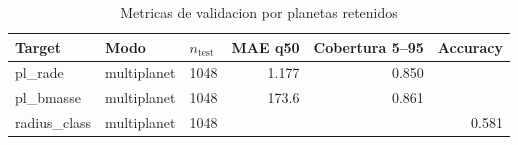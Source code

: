 \begin{table}[H]
\centering
\caption{Metricas de validacion por planetas retenidos}
\label{tab:validation-metrics}
\small
\begin{tabular}{lllrrr}
\toprule
Target & Modo & $n_{\mathrm{test}}$ & MAE q50 & Cobertura 5--95 & Accuracy \\
\midrule
pl\_rade & multiplanet & 1048 & 1.177 & 0.850 &  \\
pl\_bmasse & multiplanet & 1048 & 173.6 & 0.861 &  \\
radius\_class & multiplanet & 1048 &  &  & 0.581 \\
\bottomrule
\end{tabular}
\end{table}
